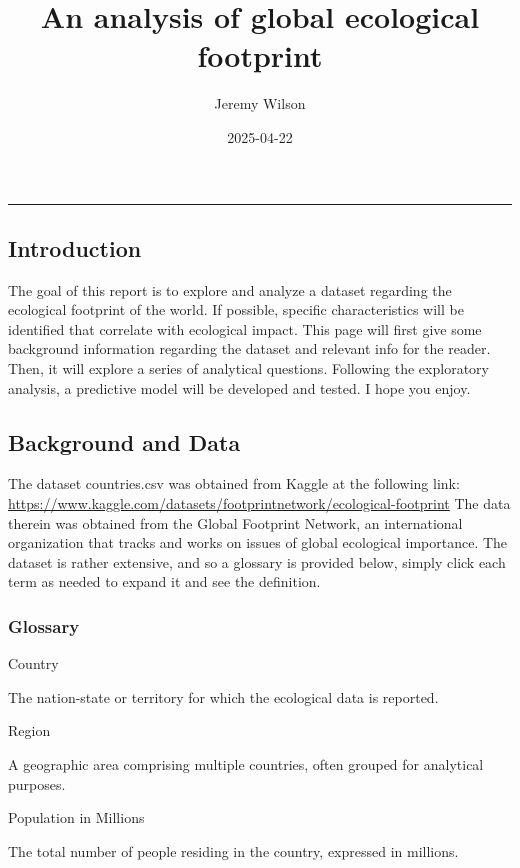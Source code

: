 \documentclass[
]{article}
\title{An analysis of global ecological footprint}
\author{Jeremy Wilson}
\date{2025-04-22}
\begin{document}
\maketitle

{
\setcounter{tocdepth}{2}
\tableofcontents
}
\begin{center}\rule{0.5\linewidth}{0.5pt}\end{center}

\subsection{Introduction}\label{introduction}

The goal of this report is to explore and analyze a dataset regarding
the ecological footprint of the world. If possible, specific
characteristics will be identified that correlate with ecological
impact. This page will first give some background information regarding
the dataset and relevant info for the reader. Then, it will explore a
series of analytical questions. Following the exploratory analysis, a
predictive model will be developed and tested. I hope you enjoy.

\subsection{Background and Data}\label{background-and-data}

The dataset countries.csv was obtained from Kaggle at the following
link:
\url{https://www.kaggle.com/datasets/footprintnetwork/ecological-footprint}
The data therein was obtained from the Global Footprint Network, an
international organization that tracks and works on issues of global
ecological importance. The dataset is rather extensive, and so a
glossary is provided below, simply click each term as needed to expand
it and see the definition.

\subsubsection{Glossary}\label{glossary}

Country

The nation-state or territory for which the ecological data is reported.

Region

A geographic area comprising multiple countries, often grouped for
analytical purposes.

Population in Millions

The total number of people residing in the country, expressed in
millions.
\end{document}
